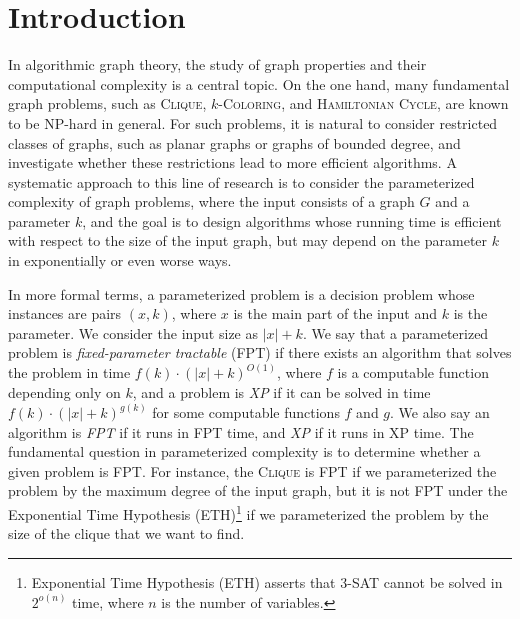 \documentclass[11pt]{article}
\title{}
\author{
}
\theoremstyle{plain}
\theoremstyle{definition}
\begin{document}
\maketitle

\begin{abstract}
    Courcelle's theorem is a fundamental result in algorithmic graph theory and parameterized complexity, which states that any graph property definable in monadic second-order logic of the second kind (MSO$_2$) can be decided in linear time on graphs of bounded treewidth. 
    In this paper, we present a self-contained full formalization of Courcelle's theorem by Lean 4, a theorem prover based on dependent type theory.
\end{abstract}

\section{Introduction}

In algorithmic graph theory, the study of graph properties and their computational complexity is a central topic. 
On the one hand, many fundamental graph problems, such as \textsc{Clique}, \textsc{$k$-Coloring}, and \textsc{Hamiltonian Cycle}, are known to be NP-hard in general.
For such problems, it is natural to consider restricted classes of graphs, such as planar graphs or graphs of bounded degree, and investigate whether these restrictions lead to more efficient algorithms.
A systematic approach to this line of research is to consider the parameterized complexity of graph problems, where the input consists of a graph $G$ and a parameter $k$, and the goal is to design algorithms whose running time is efficient with respect to the size of the input graph, but may depend on the parameter $k$ in exponentially or even worse ways.

In more formal terms, a parameterized problem is a decision problem whose instances are pairs $(x, k)$, where $x$ is the main part of the input and $k$ is the parameter. We consider the input size as $|x| + k$.
We say that a parameterized problem is \emph{fixed-parameter tractable} (FPT) if there exists an algorithm that solves the problem in time $f(k) \cdot (|x| + k)^{O(1)}$, where $f$ is a computable function depending only on $k$, and a problem is \emph{XP} if it can be solved in time $f(k) \cdot (|x| + k)^{g(k)}$ for some computable functions $f$ and $g$.
We also say an algorithm is \emph{FPT} if it runs in FPT time, and \emph{XP} if it runs in XP time.
The fundamental question in parameterized complexity is to determine whether a given problem is FPT. 
For instance, the \textsc{Clique} is FPT if we parameterized the problem by the maximum degree of the input graph, but it is not FPT under the Exponential Time Hypothesis (ETH)\footnote{Exponential Time Hypothesis (ETH) asserts that 3-SAT cannot be solved in $2^{o(n)}$ time, where $n$ is the number of variables.} if we parameterized the problem by the size of the clique that we want to find.
\end{document}
